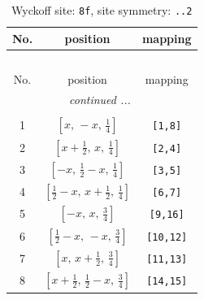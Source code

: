 \documentclass[fleqn,8pt]{jsarticle}
\begin{document}
\begin{longtable}{ccc}
\caption{Wyckoff site: {\tt 8f}, site symmetry: {\tt ..2}}
 \\
 \hline \hline
No. & position & mapping \\ \hline \endfirsthead

\multicolumn{2}{l}{\tablename\ \thetable{}} \\
 \hline \hline
No. & position & mapping \\ \hline \endhead

 \hline \hline
\multicolumn{2}{r}{\footnotesize\it continued ...} \\ \endfoot

 \hline \hline
\multicolumn{2}{r}{} \\ \endlastfoot

1 & $\left[ x,\, - x,\, \frac{1}{4} \right]$ & {\tt [1,8]} \\ \hline
2 & $\left[ x + \frac{1}{2},\, x,\, \frac{1}{4} \right]$ & {\tt [2,4]} \\ \hline
3 & $\left[ - x,\, \frac{1}{2} - x,\, \frac{1}{4} \right]$ & {\tt [3,5]} \\ \hline
4 & $\left[ \frac{1}{2} - x,\, x + \frac{1}{2},\, \frac{1}{4} \right]$ & {\tt [6,7]} \\ \hline
5 & $\left[ - x,\, x,\, \frac{3}{4} \right]$ & {\tt [9,16]} \\ \hline
6 & $\left[ \frac{1}{2} - x,\, - x,\, \frac{3}{4} \right]$ & {\tt [10,12]} \\ \hline
7 & $\left[ x,\, x + \frac{1}{2},\, \frac{3}{4} \right]$ & {\tt [11,13]} \\ \hline
8 & $\left[ x + \frac{1}{2},\, \frac{1}{2} - x,\, \frac{3}{4} \right]$ & {\tt [14,15]} \\
\end{longtable}
\renewcommand{\arraystretch}{1.2}
\end{document}
